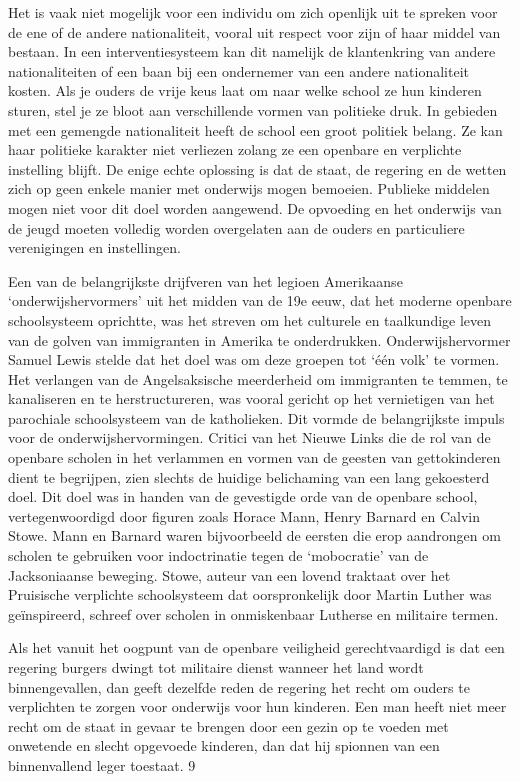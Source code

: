 \documentclass[
  a5paper,
  smalldemyvopaper,10pt,twoside,onecolumn,openright,extrafontsizes,hidelinks]{memoir}
\renewenvironment{quote}%
               {\list{}{\rightmargin=.6cm\leftmargin=.6cm}%
                \itshape \item[]}%
               {\endlist}
\begin{document}
\begin{quote}
Het is vaak niet mogelijk voor een individu om zich openlijk uit te
spreken voor de ene of de andere nationaliteit, vooral uit respect voor
zijn of haar middel van bestaan. In een interventiesysteem kan dit
namelijk de klantenkring van andere nationaliteiten of een baan bij een
ondernemer van een andere nationaliteit kosten. Als je ouders de vrije
keus laat om naar welke school ze hun kinderen sturen, stel je ze bloot
aan verschillende vormen van politieke druk. In gebieden met een
gemengde nationaliteit heeft de school een groot politiek belang. Ze kan
haar politieke karakter niet verliezen zolang ze een openbare en
verplichte instelling blijft. De enige echte oplossing is dat de staat,
de regering en de wetten zich op geen enkele manier met onderwijs mogen
bemoeien. Publieke middelen mogen niet voor dit doel worden aangewend.
De opvoeding en het onderwijs van de jeugd moeten volledig worden
overgelaten aan de ouders en particuliere verenigingen en instellingen.
\end{quote}

Een van de belangrijkste drijfveren van het legioen Amerikaanse
`onderwijshervormers' uit het midden van de 19e eeuw, dat het moderne
openbare schoolsysteem oprichtte, was het streven om het culturele en
taalkundige leven van de golven van immigranten in Amerika te
onderdrukken. Onderwijshervormer Samuel Lewis stelde dat het doel was om
deze groepen tot `één volk' te vormen. Het verlangen van de
Angelsaksische meerderheid om immigranten te temmen, te kanaliseren en
te herstructureren, was vooral gericht op het vernietigen van het
parochiale schoolsysteem van de katholieken. Dit vormde de belangrijkste
impuls voor de onderwijshervormingen. Critici van het Nieuwe Links die
de rol van de openbare scholen in het verlammen en vormen van de geesten
van gettokinderen dient te begrijpen, zien slechts de huidige
belichaming van een lang gekoesterd doel. Dit doel was in handen van de
gevestigde orde van de openbare school, vertegenwoordigd door figuren
zoals Horace Mann, Henry Barnard en Calvin Stowe. Mann en Barnard waren
bijvoorbeeld de eersten die erop aandrongen om scholen te gebruiken voor
indoctrinatie tegen de `mobocratie' van de Jacksoniaanse beweging.
Stowe, auteur van een lovend traktaat over het Pruisische verplichte
schoolsysteem dat oorspronkelijk door Martin Luther was geïnspireerd,
schreef over scholen in onmiskenbaar Lutherse en militaire termen.

\begin{quote}
Als het vanuit het oogpunt van de openbare veiligheid gerechtvaardigd is
dat een regering burgers dwingt tot militaire dienst wanneer het land
wordt binnengevallen, dan geeft dezelfde reden de regering het recht om
ouders te verplichten te zorgen voor onderwijs voor hun kinderen. Een
man heeft niet meer recht om de staat in gevaar te brengen door een
gezin op te voeden met onwetende en slecht opgevoede kinderen, dan dat
hij spionnen van een binnenvallend leger toestaat. 9
\end{quote}
\end{document}
